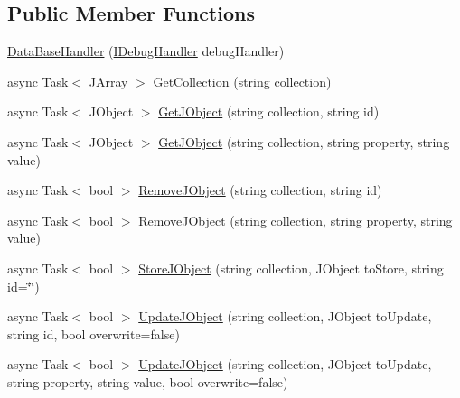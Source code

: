 \subsection*{Public Member Functions}
\begin{DoxyCompactItemize}
\item 
\mbox{\hyperlink{class_little_weeb_library_1_1_handlers_1_1_data_base_handler_af3623e6075f8aaf6f5082994cd1448df}{Data\+Base\+Handler}} (\mbox{\hyperlink{interface_little_weeb_library_1_1_handlers_1_1_i_debug_handler}{I\+Debug\+Handler}} debug\+Handler)
\item 
async Task$<$ J\+Array $>$ \mbox{\hyperlink{class_little_weeb_library_1_1_handlers_1_1_data_base_handler_ae04312874502a18b241c1123ef963b90}{Get\+Collection}} (string collection)
\item 
async Task$<$ J\+Object $>$ \mbox{\hyperlink{class_little_weeb_library_1_1_handlers_1_1_data_base_handler_a7f61583807f99b7838a33d2db0f7ca68}{Get\+J\+Object}} (string collection, string id)
\item 
async Task$<$ J\+Object $>$ \mbox{\hyperlink{class_little_weeb_library_1_1_handlers_1_1_data_base_handler_a4d7ed521cd4bedc0d650bc01afc67587}{Get\+J\+Object}} (string collection, string property, string value)
\item 
async Task$<$ bool $>$ \mbox{\hyperlink{class_little_weeb_library_1_1_handlers_1_1_data_base_handler_a7821535a003c7675c09ba846bd9502ca}{Remove\+J\+Object}} (string collection, string id)
\item 
async Task$<$ bool $>$ \mbox{\hyperlink{class_little_weeb_library_1_1_handlers_1_1_data_base_handler_ac9938b8d47b353d15c8e77e94849896e}{Remove\+J\+Object}} (string collection, string property, string value)
\item 
async Task$<$ bool $>$ \mbox{\hyperlink{class_little_weeb_library_1_1_handlers_1_1_data_base_handler_a5e6a70ef81b049da46b6ae3a15b09cd3}{Store\+J\+Object}} (string collection, J\+Object to\+Store, string id=\char`\"{}\char`\"{})
\item 
async Task$<$ bool $>$ \mbox{\hyperlink{class_little_weeb_library_1_1_handlers_1_1_data_base_handler_a9b2223ff71f688234f95d247ea3b5739}{Update\+J\+Object}} (string collection, J\+Object to\+Update, string id, bool overwrite=false)
\item 
async Task$<$ bool $>$ \mbox{\hyperlink{class_little_weeb_library_1_1_handlers_1_1_data_base_handler_ae1bd1078fc9253555322dc0609c49863}{Update\+J\+Object}} (string collection, J\+Object to\+Update, string property, string value, bool overwrite=false)
\end{DoxyCompactItemize}
